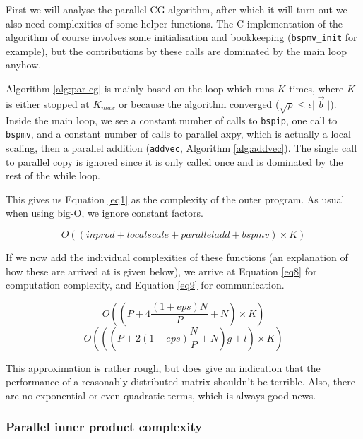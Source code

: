 \documentclass[a4paper]{article}
\newcommand{\ve}[1]{\ensuremath{\vec{#1}}}
\begin{document}
First we will analyse the parallel CG algorithm, after which it will turn out we also need
complexities of some helper functions. The C implementation of the algorithm of course
involves some initialisation and bookkeeping (\texttt{bspmv\_init} for example), but the
contributions by these calls are dominated by the main loop anyhow.

Algorithm \ref{alg:par-cg} is mainly based on the loop which runs $K$ times, where $K$ is
either stopped at $K_{max}$ or because the algorithm converged ($\sqrt \rho \leq \epsilon || \ve b||$).
Inside the main loop, we see a constant number of calls to \texttt{bspip}, one call to \texttt{bspmv}, and a constant
number of calls to parallel axpy, which is actually a local scaling, then a parallel addition (\texttt{addvec}, Algorithm \ref{alg:addvec}).
The single call to parallel copy is ignored since it is only called once and is dominated by the rest of the while loop.

This gives us Equation \ref{eq1} as the complexity of the outer program. As usual when using big-O, we ignore
constant factors.

\begin{equation}
    O\left( (inprod + localscale + paralleladd + bspmv)\times K \right)
    \label{eq1}
\end{equation}

If we now add the individual complexities of these functions
(an explanation of how these are arrived at is given below), we
arrive at Equation \ref{eq8} for computation complexity, and Equation
\ref{eq9} for communication.

\begin{equation}
    O\left( \left(P+4\frac{\left(1+eps\right) N}{P} + N\right) \times K\right)
    \label{eq8}
\end{equation}
\begin{equation}
    O\left( \left( \left( P + 2\left(1+eps\right)\frac{N}{P} + N \right)g + l\right) \times K\right)
    \label{eq9}
\end{equation}

This approximation is rather rough, but does give an indication
that the performance of a reasonably-distributed matrix shouldn't
be terrible. Also, there are no exponential or even quadratic terms,
which is always good news.

\subsubsection{Parallel inner product complexity}
\end{document}
